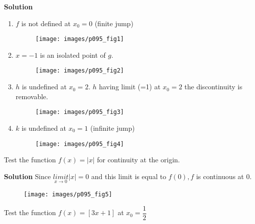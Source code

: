 \documentclass[11pt]{amsbook}
\begin{document}
\begin{tabular}{ l r }

\end{tabular}

\textbf{Solution}

\begin{enumerate}
\item $ f $ is not defined at $ x_0 = 0 $ (finite jump) 
\begin{figure}[h]
\texttt{[image: images/p095\_fig1]}
\caption{       }
\label{fig:p095_fig1}
\end{figure} 
\item $ x = -1 $ is an isolated point of $ g $.
\begin{figure}[h]
\texttt{[image: images/p095\_fig2]}
\caption{       }
\label{fig:p095_fig2}
\end{figure} 

\item $ h $ is undefined at $ x_0 = 2 $. $ h $ having limit (=1)  at  $ x_0=2 $ the discontinuity is removable.
\begin{figure}[h]
\texttt{[image: images/p095\_fig3]}
\caption{       }
\label{fig:p095_fig3}
\end{figure} 


\item $ k $ is undefined at $ x_0 = 1 $ (infinite jump) 
\begin{figure}
\texttt{[image: images/p095\_fig4]}
\caption{}
\label{fig:p095_fig4}
\end{figure} 
\end{enumerate}

\begin{exmp}
Test the function $  f(x) = |x|  $ for continuity at the origin. 
\end{exmp} 

\textbf{Solution} Since $ \underset{x \rightarrow 0}{limit} |x| = 0 $ and this limit is equal to $ f(0), f $ is continuous at 0.

\begin{figure}
\texttt{[image: images/p095\_fig5]}
\caption{}
\label{fig:p095_fig5}
\end{figure} 


\begin{exmp}
Test the function $ f(x) = [ 3x + 1 ] $ at  $ x_0 = \dfrac{1}{2} $
\end{exmp}
\end{document}
